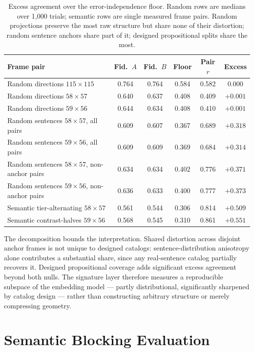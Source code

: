 \documentclass[11pt]{article}
\begin{document}
\begin{table}[t]
\centering
\small
\begin{tabular}{@{}lccccc@{}}
\toprule
Frame pair & Fid.\ $A$ & Fid.\ $B$ & Floor & Pair $r$ & Excess \\
\midrule
Random directions $115{\times}115$ & 0.764 & 0.764 & 0.584 & 0.582 & $0.000$ \\
Random directions $58{\times}57$ & 0.640 & 0.637 & 0.408 & 0.409 & $+0.001$ \\
Random directions $59{\times}56$ & 0.644 & 0.634 & 0.408 & 0.410 & $+0.001$ \\
Random sentences $58{\times}57$, all pairs & 0.609 & 0.607 & 0.367 & 0.689 & $+0.318$ \\
Random sentences $59{\times}56$, all pairs & 0.609 & 0.609 & 0.369 & 0.684 & $+0.314$ \\
Random sentences $58{\times}57$, non-anchor pairs & 0.634 & 0.634 & 0.402 & 0.776 & $+0.371$ \\
Random sentences $59{\times}56$, non-anchor pairs & 0.636 & 0.633 & 0.400 & 0.777 & $+0.373$ \\
Semantic tier-alternating $58{\times}57$ & 0.561 & 0.544 & 0.306 & 0.814 & $+0.509$ \\
Semantic contrast-halves $59{\times}56$ & 0.568 & 0.545 & 0.310 & 0.861 & $+0.551$ \\
\bottomrule
\end{tabular}
\caption{Excess agreement over the error-independence floor. Random rows are medians over 1{,}000 trials; semantic rows are single measured frame pairs. Random projections preserve the most raw structure but share none of their distortion; random sentence anchors share part of it; designed propositional splits share the most.}
\label{tab:excess}
\end{table}

The decomposition bounds the interpretation. Shared distortion across disjoint anchor frames is not unique to designed catalogs: sentence-distribution anisotropy alone contributes a substantial share, since any real-sentence catalog partially recovers it. Designed propositional coverage adds significant excess agreement beyond both nulls. The signature layer therefore measures a reproducible subspace of the embedding model --- partly distributional, significantly sharpened by catalog design --- rather than constructing arbitrary structure or merely compressing geometry.

\section{Semantic Blocking Evaluation}
\label{sec:blocking}
\end{document}
